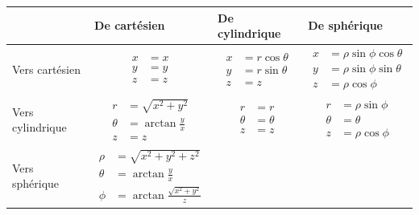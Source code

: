 \begin{table}[htbp]
	\centering
	\begin{tabular}{|p{3cm}|p{3cm}|p{3cm}|p{3cm}|}
		\hline
		& De cartésien & De cylindrique & De sphérique \\
		\hline
		Vers cartésien &
		\vbox{\begin{align*}
				  x &= x \\
				  y &= y \\
				  z &= z
		\end{align*}}
		&
		\vbox{\begin{align*}
				  x &= r \cos \theta \\
				  y &= r \sin \theta \\
				  z &= z
		\end{align*}}
		&
		\vbox{\begin{align*}
				  x &= \rho \sin \phi \cos \theta \\
				  y &= \rho \sin \phi \sin \theta \\
				  z &= \rho \cos \phi
		\end{align*}}
		\\
		\hline
		Vers cylindrique &
		\vbox{\begin{align*}
				  r &= \sqrt{x^2+y^2} \\
				  \theta &= \arctan \frac{y}{x} \\
				  z &= z
		\end{align*}}
		&  %
		\vbox{\begin{align*}
				  r &= r \\
				  \theta &= \theta \\
				  z &= z
		\end{align*}}
		& %
		\vbox{\begin{align*}
				  r &= \rho \sin \phi \\
				  \theta &= \theta \\
				  z &= \rho \cos \phi
		\end{align*}}
		\\
		\hline
		Vers sphérique &
		\vbox{\begin{align*}
				  \rho &= \sqrt{x^2+y^2+z^2} \\
				  \theta &= \arctan \frac{y}{x} \\
				  \phi &= \arctan \frac{\sqrt{x^2+y^2}}{z}
		\end{align*}}
		&
		\vbox{\begin{align*}

\end{align*}}
\end{tabular}
\end{table}
